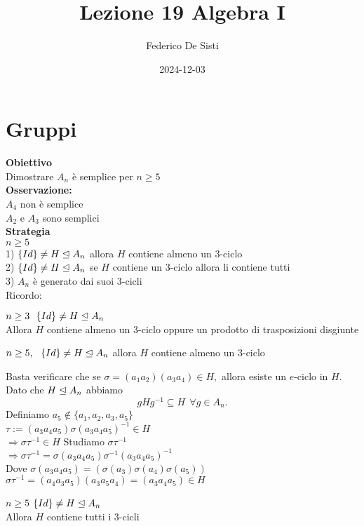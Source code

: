 \documentclass[12px]{article}
\title{Lezione 19 Algebra I}
\date{2024-12-03}
\author{Federico De Sisti}
\begin{document}
	\maketitle
	\newpage
	\section{Gruppi}
	\textbf{Obiettivo}\\
	Dimostrare $A_n$ è semplice per  $n \geq 5$\\
	\textbf{Osservazione:}\\
	$A_4$ non è semplice\\
	$A_2$ e $A_3$ sono semplici\\
	\textbf{Strategia}\\
	$n \geq 5$\\
	1)  $\{Id\} \neq H\trianglelefteq A_n$ allora  $H$ contiene almeno un $3$-ciclo\\
	2) $\{Id\}\neq H\trianglelefteq A_n$ se $H$ contiene un $3$-ciclo allora li contiene tutti\\
	3) $A_n$ è generato dai suoi $3$-cicli\\
	Ricordo:
	\begin{lemm}
		$n\geq 3 \ \ \{Id\}\neq H\trianglelefteq A_n$\\
		Allora $H$ contiene almeno un $3$-ciclo oppure un prodotto di trasposizioni disgiunte
	\end{lemm}
	\begin{prop}
		$n\geq 5, \ \ \{Id\}\neq H\trianglelefteq A_n$ allora $H$ contiene almeno un $3$-ciclo
	\end{prop}
	\begin{dimo}
		Basta verificare che se $\sigma = (a_1a_2)(a_3a_4)\in H, $ allora esiste un $e$-ciclo in $H$.\\
		Dato che  $H\trianglelefteq A_n$ abbiamo 
		\[
			gHg^{-1}\subseteq H \ \ \forall g\in A_n
		.\] 
		Definiamo $a_5 \not\in \{a_1,a_2,a_3,a_5\}$\\
		$\tau := (a_3a_4a_5)\sigma(a_3a_4a_5)^{-1}\in H$\\
		$ \Rightarrow \sigma \tau^{-1}\in H$ Studiamo $\sigma\tau^{-1}$\\
		$ \Rightarrow \sigma\tau^{-1} = \sigma(a_3a_4a_5)\sigma^{-1}(a_3a_4a_5)^{-1}$ \\
		Dove  $\sigma(a_3a_4a_5) = (\sigma(a_3)\sigma(a_4)\sigma(a_5))$\\
		$\sigma\tau^{-1} = (a_4a_3a_5)(a_3a_5a_4) = (a_3a_4a_5)\in H$
	\end{dimo}
	\begin{teo}
		$n\geq 5$ $\{Id\}\neq H\trianglelefteq A_n$\\
		Allora  $H$ contiene tutti i $3$-cicli\\
	\end{teo}
\end{document}
